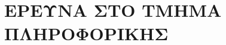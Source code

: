 \hypertarget{ux3b5ux3c1ux3b5ux3c5ux3bdux3b1-ux3c3ux3c4ux3bf-ux3c4ux3bcux3b7ux3bcux3b1-ux3c0ux3bbux3b7ux3c1ux3bfux3c6ux3bfux3c1ux3b9ux3baux3b7ux3c3}{%
\chapter{ΕΡΕΥΝΑ ΣΤΟ ΤΜΗΜΑ
ΠΛΗΡΟΦΟΡΙΚΗΣ}\label{ux3b5ux3c1ux3b5ux3c5ux3bdux3b1-ux3c3ux3c4ux3bf-ux3c4ux3bcux3b7ux3bcux3b1-ux3c0ux3bbux3b7ux3c1ux3bfux3c6ux3bfux3c1ux3b9ux3baux3b7ux3c3}}

